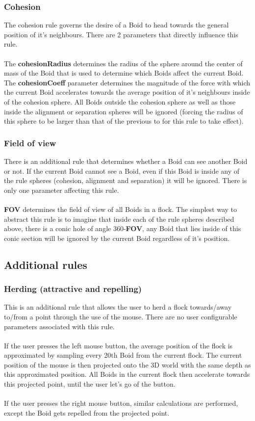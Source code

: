 \documentclass[12pt]{article}
\begin{document}
\subsubsection{Cohesion}
The cohesion rule governs the desire of a Boid to head towards the general position of it's neighbours. There are 2 parameters that directly influence this rule.
\\ \\
The \textbf{cohesionRadius} determines the radius of the sphere around the center of mass of the Boid that is used to determine which Boids affect the current Boid. The \textbf{cohesionCoeff} parameter determines the magnitude of the force with which the current Boid  accelerates towards the average position of it's neighbours inside of the cohesion sphere. All Boids outside the cohesion sphere as well as those inside the alignment or separation spheres will be ignored (forcing the radius of this sphere to be larger than that of the previous to for this rule to take effect).

\subsubsection{Field of view}
There is an additional rule that determines whether a Boid can see another Boid or not. If the current Boid cannot see a Boid, even if this Boid is inside any of the rule spheres (cohesion, alignment and separation) it will be ignored. There is only one parameter affecting this rule.
\\ \\
\textbf{FOV} determines the field of view of all Boids in a flock. The simplest way to abstract this rule is to imagine that inside each of the rule spheres described above, there is a conic hole of angle 360-\textbf{FOV}, any Boid that lies inside of this conic section will be ignored by the current Boid regardless of it's position.

\subsection{Additional rules}
\subsubsection{Herding (attractive and repelling)}
This is an additional rule that allows the user to herd a flock towards/away to/from a point through the use of the mouse. There are no user configurable parameters associated with this rule.
\\ \\
If the user presses the left mouse button, the average position of the flock is approximated by sampling every 20th Boid from the current flock. The current position of the mouse is then projected onto the 3D world with the same depth as this approximated position. All Boids in the current flock then accelerate towards this projected point, until the user let's go of the button.
\\ \\
If the user presses the right mouse button, similar calculations are performed, except the Boid gets repelled from the projected point.
\end{document}
